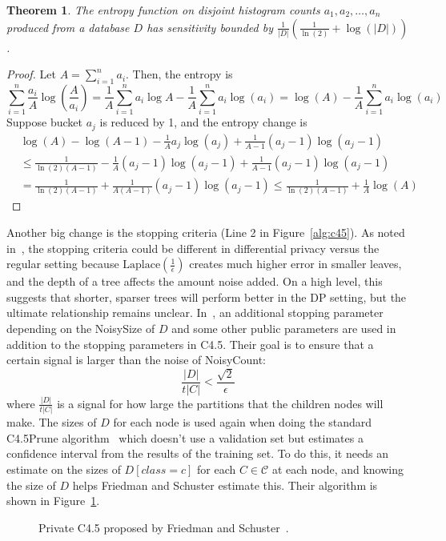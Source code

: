 \documentclass[11pt]{report}
\newtheorem{theorem}{Theorem}
\begin{document}
\begin{theorem}\label{thm:ent_sens}
The entropy function on disjoint histogram counts $a_1,a_2,\ldots, a_n$ produced from a database $D$ has sensitivity bounded by $\frac{1}{|D|}\left(\frac{1}{\ln(2)} + \log(|D|) \right)$.
\end{theorem}
\begin{proof}
Let $A = \sum_{i=1}^n a_i$. Then, the entropy is 
\[
\sum_{i=1}^n \frac{a_i}{A}\log\left(\frac{A}{a_i}\right) = \frac{1}{A}\sum_{i=1}^n a_i\log A - \frac{1}{A} \sum_{i=1}^n a_i\log(a_i) = \log(A) - \frac{1}{A}\sum_{i=1}^n a_i\log(a_i)
\]
Suppose bucket $a_j$ is reduced by 1, and the entropy change is
\begin{align*}
&\log(A) - \log(A-1) - \frac{1}{A} a_j\log(a_j) + \frac{1}{A-1} (a_j-1)\log(a_j-1) \\
&\leq \frac{1}{\ln(2)(A-1)} -\frac{1}{A}(a_j-1)\log(a_j-1) + \frac{1}{A-1}(a_j-1)\log(a_j-1) \\
&= \frac{1}{\ln(2)(A-1)}+\frac{1}{A(A-1)}(a_j-1)\log(a_j-1) \leq \frac{1}{\ln(2)(A-1)} + \frac{1}{A}\log(A)
\end{align*}
\end{proof}
Another big change is the stopping criteria (Line 2 in Figure~\ref{alg:c45}). As noted in~\cite{Fletcher:2016}, the stopping criteria could be different in differential privacy versus the regular setting because $\text{Laplace}\left(\frac{1}{\epsilon}\right)$ creates much higher error in smaller leaves, and the depth of a tree affects the amount noise added. On a high level, this suggests that shorter, sparser trees will perform better in the DP setting, but the ultimate relationship remains unclear. In~\cite{Friedman:2010}, an additional stopping parameter depending on the NoisySize of $D$ and some other public parameters are used in addition to the stopping parameters in C4.5. Their goal is to ensure that a certain signal is larger than the noise of NoisyCount:
\[
\frac{|D|}{t|C|} < \frac{\sqrt{2}}{\epsilon}
\]
where $\frac{|D|}{t|C|}$ is a signal for how large the partitions that the children nodes will make. The sizes of $D$ for each node is used again when doing the standard C4.5Prune algorithm~\cite{Quinlan:1993} which doesn't use a validation set but estimates a confidence interval from the results of the training set. To do this, it needs an estimate on the sizes of $D[class=c]$ for each $C \in \mathcal{C}$ at each node, and knowing the size of $D$ helps Friedman and Schuster estimate this. Their algorithm is shown in Figure~\ref{alg:pc45}.
\begin{figure}

\caption{Private C4.5 proposed by Friedman and Schuster~\cite{Friedman:2010}. } \label{alg:pc45}
\end{figure}
\end{document}
